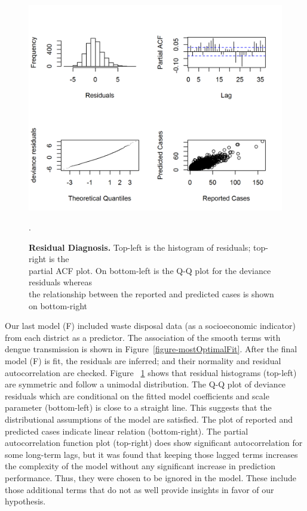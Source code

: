 \documentclass{bmcart}
\begin{document}
\begin{figure}[h!]
	\begin{center}
		\includegraphics[width= 1.0\textwidth]{19-resid-diagnosis}
		\caption{\textbf{Residual Diagnosis.} Top-left is the histogram of residuals; top-right is the \\ partial ACF plot. On bottom-left is the Q-Q plot for the deviance residuals whereas \\ the relationship between the reported and predicted cases is shown on bottom-right}.
		\label{figure:resid-diagnosis}
	\end{center}
\end{figure}



Our last model (F) included waste disposal data (as a socioeconomic indicator) from each district as a predictor. The association of the smooth terms with dengue transmission is shown in Figure~\ref{figure-mostOptimalFit}. After the final model (F) is fit, the residuals are inferred; and their normality and residual autocorrelation are checked. Figure ~\ref{figure:resid-diagnosis} shows that residual histograms (top-left) are symmetric and follow a unimodal distribution. The Q-Q plot of deviance residuals which are conditional on the fitted model coefficients and scale parameter (bottom-left) is close to a straight line. This suggests that the distributional assumptions of the model are satisfied. The plot of reported and predicted cases indicate linear relation (bottom-right). The partial autocorrelation function plot (top-right) does show significant autocorrelation for some long-term lags, but it was found that keeping those lagged terms increases the complexity of the model without any significant increase in prediction performance. Thus, they were chosen to be ignored in the model. These include those additional terms that do not as well provide insights in favor of our hypothesis.
\end{document}
